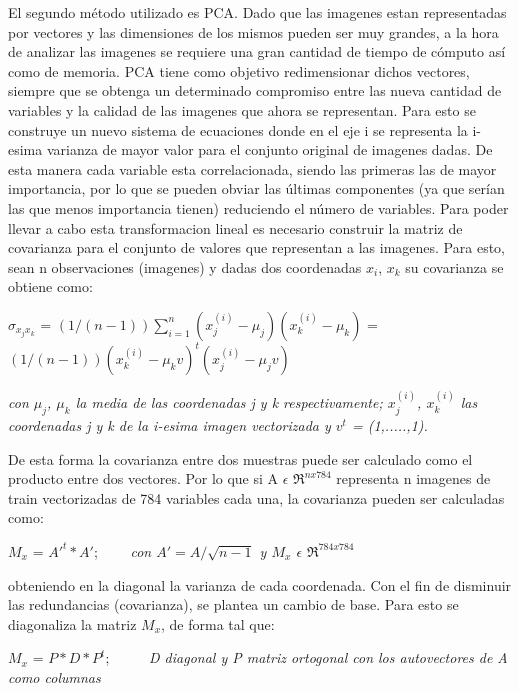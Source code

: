 El segundo método utilizado es PCA. Dado que las imagenes estan representadas por vectores y las dimensiones de los mismos pueden ser muy grandes, a la hora de analizar las imagenes se requiere una gran cantidad de tiempo de cómputo así como de memoria. PCA tiene como objetivo redimensionar dichos vectores, siempre que se obtenga un determinado compromiso entre las nueva cantidad de variables y la calidad de las imagenes que ahora se representan. Para esto se construye un nuevo sistema de ecuaciones donde en el eje i se representa la i-esima varianza de mayor valor para el conjunto original de imagenes dadas. De esta manera cada variable esta correlacionada, siendo las primeras las de mayor importancia, por lo que se pueden obviar las últimas componentes (ya que serían las que menos importancia tienen) reduciendo el número de variables. Para poder llevar a cabo esta transformacion lineal es necesario construir la matriz de covarianza para el conjunto de valores que representan a las imagenes.
Para esto, sean n observaciones (imagenes) y dadas dos coordenadas $x_i$, $x_k$ su covarianza se obtiene como: \newline


$\sigma_{x_j x_k}$ = $(1/(n-1))\sum_{i=1}^{n}(x_{j}^{(i)}-\mu_j)(x_{k}^{(i)}-\mu_k)$  = $(1/(n-1))(x_{k}^{(i)}-\mu_kv)^{t}(x_{j}^{(i)}-\mu_jv)$ \newline

\textit{con $\mu_j$, $\mu_k$ la media de las coordenadas j y k respectivamente; $x_{j}^{(i)}$, $x_{k}^{(i)}$ las coordenadas j y k de la i-esima imagen vectorizada y $v^{t}$ = (1,.....,1).}\newline

De esta forma la covarianza entre dos muestras puede ser calculado como el producto entre dos vectores. Por lo que si A $\epsilon$ $\Re^{nx784}$ representa n imagenes de train vectorizadas de 784 variables cada una, la covarianza pueden ser calculadas como:\newline

 $M_x$ = $A'^{t}*A'$; \ \ \ \ \textit {con $A'=A/\sqrt{n-1}$ y $M_x$ $\epsilon$  $\Re^{784x784}$} \newline

obteniendo en la diagonal la varianza de cada coordenada. Con el fin de disminuir las redundancias (covarianza), se plantea un cambio de base. Para esto se diagonaliza la matriz $M_x$, de forma tal que: \newline

 $M_x$ = $P*D*P^{t}$; \ \ \ \ \ \textit{D diagonal y P matriz ortogonal con los autovectores de A como columnas} \newline%
 
